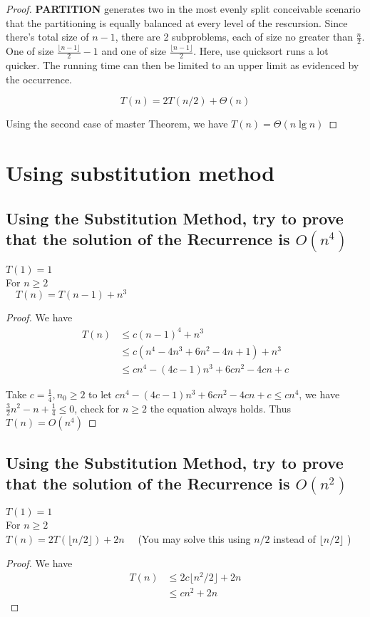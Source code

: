 \documentclass[a4paper]{article}
\begin{document}
\begin{proof}
  \textbf{PARTITION} generates two in the most evenly split conceivable scenario that the partitioning is equally balanced at every level of the rescursion. Since there's total size of $n - 1$, there are 2 subproblems, each of size no greater than $\frac{n}2$. One of size $\frac{\lfloor n - 1\rfloor}2 - 1 $ and one of size $\frac{\lfloor n - 1\rfloor}2$. Here, use quicksort runs a lot quicker. The running time can then be limited to an upper limit as evidenced by the occurrence.

  $$T(n)=2 T(n / 2)+\Theta(n)$$

  Using the second case of master Theorem, we have $T(n)=\Theta(n \lg n)$
\end{proof}

\section{Using substitution method}

\subsection{Using the Substitution Method, try to prove that the solution of the Recurrence is $O(n^4)$}
$T(1)=1$\\
For $n \geq 2$\\
$\quad T(n)=T(n-1)+n^3$
\begin{proof}
  We have
  $$\begin{aligned} T(n) & \leq c(n-1)^4+n^3
                \\ & \leq c(n^4-4n^3+6n^2-4n +1)+ n^3
                \\ & \leq cn^4-(4c-1)n^3+6cn^2-4cn +c
    \end{aligned}$$

  Take $c=\frac 14,n_0\geq 2$ to let $cn^4-(4c-1)n^3+6cn^2-4cn+c\leq cn^4$, we have $\frac 3 2 n^2-n+\frac 14\leq0$, check for $n\geq 2$ the equation always holds. Thus $T(n)=O(n^4)$
\end{proof}
\subsection{Using the Substitution Method, try to prove that the solution of the Recurrence is $O(n^2)$}
$T(1)=1$ \\For $n \geq 2$\\
$T(n)=2 T(\lfloor n / 2\rfloor)+2 n \quad$ (You may solve this using $n / 2$ instead of $\lfloor n / 2\rfloor$ )
\begin{proof}
  We have
  $$\begin{aligned} T(n) & \leq 2c\lfloor n^2 / 2\rfloor+2n
                \\ & \leq cn^2+2n
    \end{aligned}$$
\end{proof}
\end{document}
